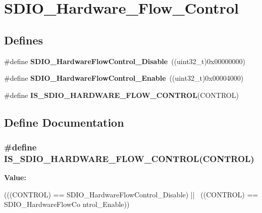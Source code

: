 \hypertarget{group__SDIO__Hardware__Flow__Control}{
\section{SDIO\_\-Hardware\_\-Flow\_\-Control}
\label{group__SDIO__Hardware__Flow__Control}
}
\subsection*{Defines}
\begin{DoxyCompactItemize}
\item 
\hypertarget{group__SDIO__Hardware__Flow__Control_ga7529a3c8a11ac685bde4aafa12c8a977}{
\#define {\bfseries SDIO\_\-HardwareFlowControl\_\-Disable}~((uint32\_\-t)0x00000000)}
\label{group__SDIO__Hardware__Flow__Control_ga7529a3c8a11ac685bde4aafa12c8a977}

\item 
\hypertarget{group__SDIO__Hardware__Flow__Control_gab6cfef6778d829f3dcefc6c2bad7c9aa}{
\#define {\bfseries SDIO\_\-HardwareFlowControl\_\-Enable}~((uint32\_\-t)0x00004000)}
\label{group__SDIO__Hardware__Flow__Control_gab6cfef6778d829f3dcefc6c2bad7c9aa}

\item 
\#define {\bfseries IS\_\-SDIO\_\-HARDWARE\_\-FLOW\_\-CONTROL}(CONTROL)
\end{DoxyCompactItemize}


\subsection{Define Documentation}
\hypertarget{group__SDIO__Hardware__Flow__Control_gad8be549f8348479d064dff21343ae411}{
\subsubsection[{IS\_\-SDIO\_\-HARDWARE\_\-FLOW\_\-CONTROL}]{\setlength{\rightskip}{0pt plus 5cm}\#define IS\_\-SDIO\_\-HARDWARE\_\-FLOW\_\-CONTROL(CONTROL)}}
\label{group__SDIO__Hardware__Flow__Control_gad8be549f8348479d064dff21343ae411}
{\bfseries Value:}
\begin{DoxyCode}
(((CONTROL) == SDIO_HardwareFlowControl_Disable) || \
                                                ((CONTROL) == SDIO_HardwareFlowCo
      ntrol_Enable))
\end{DoxyCode}
